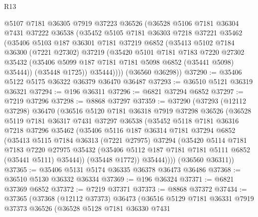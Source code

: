 \begin{lexlean}{R13}
\begin{coremodule}
        @5107
        @7181
        @36305
        @7919
        @37223
        @36526
        (@36528
          @5106
          @7181
          @36304
          @7431
          @37222
          @36538
          (@35452
            @5105
            @7181
            @36303
            @7218
            @37221
            @35462
            (@35406
              @5103
              @187
              @36301
              @7181
              @37219
              @6852
              (@35413
                @5102
                @7184
                @36300
                (@7221 @27302)
                @37219
                (@35420
                  @5101
                  @7181
                  @7183
                  @7220
                  @27302
                  @35432
                  (@35406 @5099 @187 @7181 @7181 @5098 @6852 (@35441 @5098) @35444))
                (@35448 @1725))
              @35444))))
      (@36560 @36298))
@37290 := @35406 @5122 @5175 @36322 @36379 @36470 @36487
@37293 := @36510 @5121 @36319 @36321
@37294 := @196 @36311
@37296 := @6821 @37294 @6852
@37297 := @7219 @37296
@37298 := @8868 @37297
@37359 := @37290
    (@37293
      (@12112 @37298)
      @36470
      (@36516
        @5120
        @7181
        @36318
        @7919
        @37298
        @36526
        (@36528
          @5119
          @7181
          @36317
          @7431
          @37297
          @36538
          (@35452
            @5118
            @7181
            @36316
            @7218
            @37296
            @35462
            (@35406
              @5116
              @187
              @36314
              @7181
              @37294
              @6852
              (@35413
                @5115
                @7184
                @36313
                (@7221 @27975)
                @37294
                (@35420
                  @5114
                  @7181
                  @7183
                  @7220
                  @27975
                  @35432
                  (@35406 @5112 @187 @7181 @7181 @5111 @6852 (@35441 @5111) @35444))
                (@35448 @1772))
              @35444))))
      (@36560 @36311))
@37365 := @35406 @5131 @5174 @36335 @36378 @36473 @36486
@37368 := @36510 @5130 @36332 @36334
@37369 := @196 @36324
@37371 := @6821 @37369 @6852
@37372 := @7219 @37371
@37373 := @8868 @37372
@37434 := @37365
    (@37368
      (@12112 @37373)
      @36473
      (@36516
        @5129
        @7181
        @36331
        @7919
        @37373
        @36526
        (@36528
          @5128
          @7181
          @36330
          @7431

\end{coremodule}
\end{lexlean}

